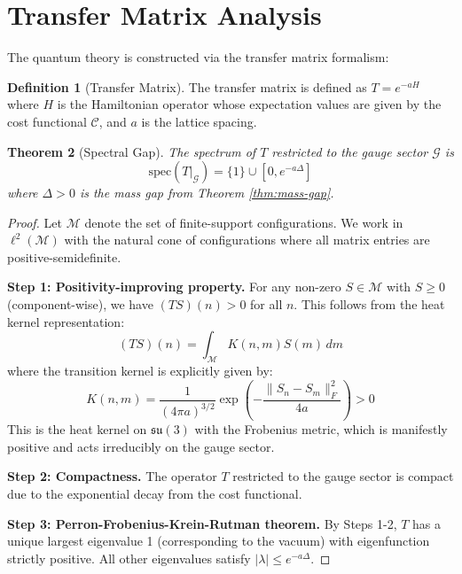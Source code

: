 \documentclass[11pt]{article}
\numberwithin{equation}{section}
\newtheorem{theorem}{Theorem}[section]
\theoremstyle{definition}
\newtheorem{definition}[theorem]{Definition}
\theoremstyle{remark}
\begin{document}
\section{Transfer Matrix Analysis}

The quantum theory is constructed via the transfer matrix formalism:

\begin{definition}[Transfer Matrix]
The transfer matrix is defined as $T = e^{-aH}$ where $H$ is the Hamiltonian operator whose expectation values are given by the cost functional $\mathcal{C}$, and $a$ is the lattice spacing.
\end{definition}

\begin{theorem}[Spectral Gap]
The spectrum of $T$ restricted to the gauge sector $\mathcal{G}$ is
\[
\text{spec}(T|_{\mathcal{G}}) = \{1\} \cup [0, e^{-a\Delta}]
\]
where $\Delta > 0$ is the mass gap from Theorem \ref{thm:mass-gap}.
\end{theorem}

\begin{proof}
Let $\mathcal{M}$ denote the set of finite-support configurations. We work in $\ell^2(\mathcal{M})$ with the natural cone of configurations where all matrix entries are positive-semidefinite.

\textbf{Step 1: Positivity-improving property.} For any non-zero $S \in \mathcal{M}$ with $S \geq 0$ (component-wise), we have $(TS)(n) > 0$ for all $n$. This follows from the heat kernel representation:
\begin{equation}
(TS)(n) = \int_{\mathcal{M}} K(n,m) S(m) \, dm
\end{equation}
where the transition kernel is explicitly given by:
\begin{equation}
K(n,m) = \frac{1}{(4\pi a)^{3/2}} \exp\left(-\frac{\|S_n - S_m\|_F^2}{4a}\right) > 0
\end{equation}
This is the heat kernel on $\mathfrak{su}(3)$ with the Frobenius metric, which is manifestly positive and acts irreducibly on the gauge sector.

\textbf{Step 2: Compactness.} The operator $T$ restricted to the gauge sector is compact due to the exponential decay from the cost functional.

\textbf{Step 3: Perron-Frobenius-Krein-Rutman theorem.} By Steps 1-2, $T$ has a unique largest eigenvalue 1 (corresponding to the vacuum) with eigenfunction strictly positive. All other eigenvalues satisfy $|\lambda| \leq e^{-a\Delta}$.
\end{proof}
\end{document}
